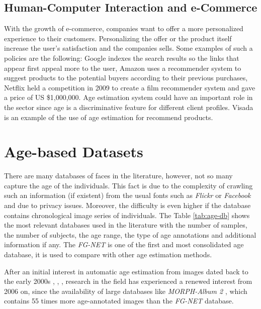 \subsection{Human-Computer Interaction and e-Commerce}
With the growth of e-commerce, companies want to offer a more personalized experience to their customers. Personalizing the offer or the product itself increase the user's satisfaction and the companies sells. Some examples of such a policies are the following: Google \cite{Brin:1998:ALH:297810.297827} indexes the search results so the links that appear first appeal more to the user, Amazon \cite{Linden:2003:ARI:642462.642471} uses a recommender system to suggest products to the potential buyers according to their previous purchases, Netflix \cite{Koren:2009:MFT:1608565.1608614} held a competition in 2009 to create a film recommender system and gave a price of US \$1,000,000. Age estimation system could have an important role in the sector since age is a discriminative feature for different client profiles. Visada \cite{visada} is an example of the use of age estimation for recommend products.


\section{Age-based Datasets} \label{sec:ageDB}
There are many databases of faces in the literature, however, not so many capture the age of the individuals. This fact is due to the complexity of crawling such an information (if existent) from the usual fonts such as \textit{Flickr} or \textit{Facebook} and due to privacy issues. Moreover, the difficulty is even higher if the database contains chronological image series of individuals. The Table \ref{tab:age-db} shows the most relevant databases used in the literature with the number of samples, the number of subjects, the age range, the type of age annotations and additional information if any. The \textit{FG-NET} \cite{993553} is one of the first and most consolidated age database, it is used to compare with other age estimation methods.

After an initial interest in automatic age estimation from images dated back to the early 2000s \cite{Lanitis:2004:CDC:2225304.2226166}, \cite{993553}, \cite{palDB}, research in the field has experienced a renewed interest from 2006 on, since the availability of large databases like \textit{MORPH-Album 2} \cite{1613043}, which contains 55 times more age-annotated images than the \textit{FG-NET} database.


